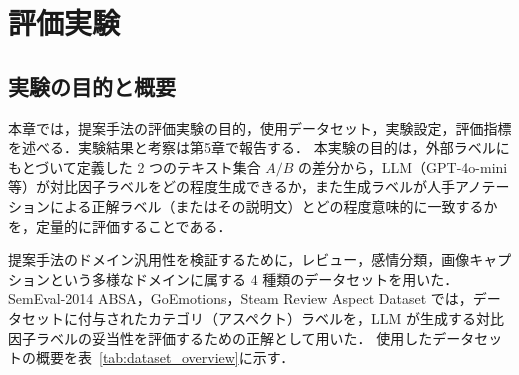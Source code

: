 \chapter{評価実験}

\section{実験の目的と概要}
本章では，提案手法の評価実験の目的，使用データセット，実験設定，評価指標を述べる．実験結果と考察は第5章で報告する．
本実験の目的は，外部ラベルにもとづいて定義した 2 つのテキスト集合 $A/B$ の差分から，LLM（GPT-4o-mini 等）が対比因子ラベルをどの程度生成できるか，また生成ラベルが人手アノテーションによる正解ラベル（またはその説明文）とどの程度意味的に一致するかを，定量的に評価することである．

提案手法のドメイン汎用性を検証するために，レビュー，感情分類，画像キャプションという多様なドメインに属する 4 種類のデータセットを用いた．
SemEval-2014 ABSA，GoEmotions，Steam Review Aspect Dataset では，データセットに付与されたカテゴリ（アスペクト）ラベルを，LLM が生成する対比因子ラベルの妥当性を評価するための正解として用いた．
使用したデータセットの概要を表~\ref{tab:dataset_overview}に示す．
\begin{table}[htbp]
  \centering
  \caption{使用データセットの概要}
  \label{tab:dataset_overview}
\end{table}

